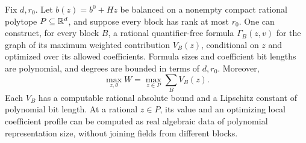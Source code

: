 \begin{lemma}
\label{lem:a-wblk-local}
Fix $d,r_0$. Let $b(z)=b^0+Hz$ be balanced on a nonempty compact rational
polytope $P\subseteq\mathbb{R}^d$, and suppose every block has rank at most $r_0$.
One can construct, for every block $B$, a rational quantifier-free formula
$\Gamma_B(z,v)$ for the graph of its maximum weighted contribution
$V_B(z)$, conditional on $z$ and optimized over its allowed coefficients.
Formula sizes and coefficient bit lengths are polynomial, and degrees
are bounded in terms of $d,r_0$. Moreover,
\[
 \max_{z,\theta}W=\max_{z\in P}\sum_B V_B(z).
\]
Each $V_B$ has a computable rational absolute bound and a Lipschitz
constant of polynomial bit length. At a rational $z\in P$, its value and
an optimizing local coefficient profile can be computed as real algebraic
data of polynomial representation size, without joining fields from
different blocks.
\end{lemma}
